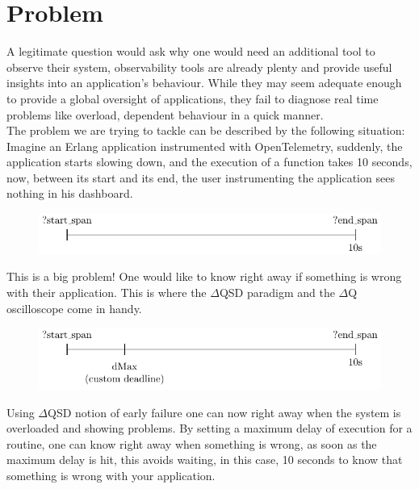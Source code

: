 \section{Problem}
    A legitimate question would ask why one would need an additional tool to observe their system, observability tools are already plenty and provide useful insights into an application's behaviour. While they may seem adequate enough to provide a global oversight of applications, they fail to diagnose real time problems like overload, dependent behaviour in a quick manner. \\
    The problem we are trying to tackle can be described by the following situation: \\
    Imagine an Erlang application instrumented with OpenTelemetry, suddenly, the application starts slowing down, and the execution of a function takes 10 seconds, now, between its start and its end, the user instrumenting the application sees nothing in his dashboard.
    \begin{figure}[H]
        \begin{center}
            \includegraphics{tikz/start_end.pdf}
        \end{center}
    \end{figure}
    This is a big problem! One would like to know right away if something is wrong with their application. This is where the $\Delta$QSD paradigm and the $\Delta$Q oscilloscope come in handy.
    \begin{figure}[H]
        \begin{center}
            \includegraphics{tikz/start_end_dmax.pdf}
        \end{center}
    \end{figure}
    Using $\Delta$QSD notion of early failure one can now right away when the system is overloaded and showing problems. By setting a maximum delay of execution for a routine, one can know right away when something is wrong, as soon as the maximum delay is hit, this avoids waiting, in this case, 10 seconds to know that something is wrong with your application.
